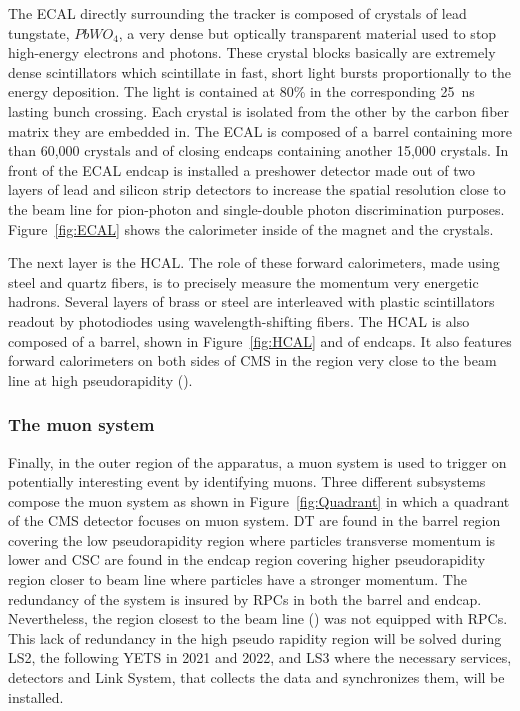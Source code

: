 	The ECAL directly surrounding the tracker is composed of crystals of lead tungstate, $PbWO_4$, a very dense but optically transparent material used to stop high-energy electrons and photons. These crystal blocks basically are extremely dense scintillators which scintillate in fast, short light bursts proportionally to the energy deposition. The light is contained at 80\% in the corresponding \SI{25}{ns} lasting bunch crossing. Each crystal is isolated from the other by the carbon fiber matrix they are embedded in. The ECAL is composed of a barrel containing more than 60,000 crystals and of closing endcaps containing another 15,000 crystals. In front of the ECAL endcap is installed a preshower detector made out of two layers of lead and silicon strip detectors to increase the spatial resolution close to the beam line for pion-photon and single-double photon discrimination purposes. Figure~\ref{fig:ECAL} shows the calorimeter inside of the magnet and the crystals.
	
	The next layer is the HCAL. The role of these forward calorimeters, made using steel and quartz fibers, is to precisely measure the momentum very energetic hadrons. Several layers of brass or steel are interleaved with plastic scintillators readout by photodiodes using wavelength-shifting fibers. The HCAL is also composed of a barrel, shown in Figure~\ref{fig:HCAL} and of endcaps. It also features forward calorimeters on both sides of CMS in the region very close to the beam line at high pseudorapidity ().
	
		\subsubsection{The muon system}
		\label{chapt2:sssec:muon}
	
	Finally, in the outer region of the apparatus, a muon system is used to trigger on potentially interesting event by identifying muons. Three different subsystems compose the muon system as shown in Figure~\ref{fig:Quadrant} in which a quadrant of the CMS detector focuses on muon system. \acf{DT} are found in the barrel region covering the low pseudorapidity region where particles transverse momentum is lower and \acf{CSC} are found in the endcap region covering higher pseudorapidity region closer to beam line where particles have a stronger momentum. The redundancy of the system is insured by \acl{RPC}s in both the barrel and endcap. Nevertheless, the region closest to the beam line () was not equipped with RPCs. This lack of redundancy in the high pseudo rapidity region will be solved during LS2, the following \acf{YETS} in 2021 and 2022, and LS3 where the necessary services, detectors and Link System, that collects the data and synchronizes them, will be installed.

